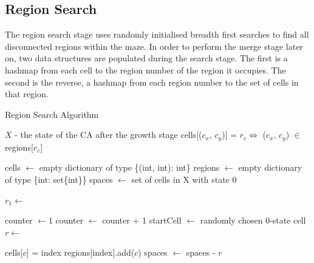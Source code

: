 \subsection{Region Search}

The region search stage uses randomly initialised breadth first searches to find all disconnected regions within the maze. In order to perform the merge stage later on, two data structures are populated during the search stage. The first is a hashmap from each cell to the region number of the region it occupies. The second is the reverse, a hashmap from each region number to the set of cells in that region.

\begin{algorithm}
  \caption{Region Search Algorithm}\label{alg:region-find}
  \begin{algorithmic}
  \Require $X$ - the state of the CA after the growth stage
  \Ensure cells[($c_x$, $c_y$)] = $r_c \iff$ ($c_x$, $c_y$) $\in$ regions[$r_c$]

  \State cells $\gets$ empty dictionary of type \{(int, int): int\}
  \State regions $\gets$ empty dictionary of type \{int: set\{int\}\}
  \State spaces $\gets$ set of cells in X with state 0

  \State $r_1 \gets$ 
  \State {}
  
  \State counter $\gets 1$
    \State counter $\gets$ counter + 1
    \State startCell $\gets$ randomly chosen 0-state cell
    \State $r \gets$ 
    \State {}
  \EndWhile

        \State cells[$c$] = index
        \State regions[index].add($c$)
    \EndFor
    \State spaces $\gets$ spaces - $r$
  \EndProcedure
  \end{algorithmic}
\end{algorithm}

